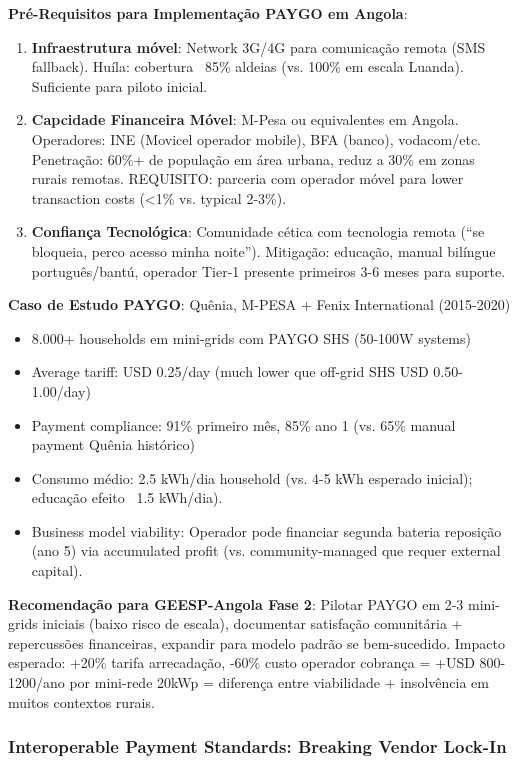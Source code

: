 \documentclass[12pt, a4paper]{article}
\begin{document}
\textbf{Pré-Requisitos para Implementação PAYGO em Angola}:
\begin{enumerate}
\item \textbf{Infraestrutura móvel}: Network 3G/4G para comunicação remota (SMS fallback). Huíla: cobertura ~85\% aldeias (vs. 100\% em escala Luanda). Suficiente para piloto inicial.
\item \textbf{Capcidade Financeira Móvel}: M-Pesa ou equivalentes em Angola. Operadores: INE (Movicel operador mobile), BFA (banco), vodacom/etc. Penetração: 60\%+ de população em área urbana, reduz a 30\% em zonas rurais remotas. REQUISITO: parceria com operador móvel para lower transaction costs (<1\% vs. typical 2-3\%).
\item \textbf{Confiança Tecnológica}: Comunidade cética com tecnologia remota (``se bloqueia, perco acesso minha noite''). Mitigação: educação, manual bilíngue português/bantú, operador Tier-1 presente primeiros 3-6 meses para suporte.
\end{enumerate}

\textbf{Caso de Estudo PAYGO}: Quênia, M-PESA + Fenix International (2015-2020)
\begin{itemize}
\item 8.000+ households em mini-grids com PAYGO SHS (50-100W systems)
\item Average tariff: USD 0.25/day (much lower que off-grid SHS USD 0.50-1.00/day)
\item Payment compliance: 91\% primeiro mês, 85\% ano 1 (vs. 65\% manual payment Quênia histórico)
\item Consumo médio: 2.5 kWh/dia household (vs. 4-5 kWh esperado inicial); educação efeito ~1.5 kWh/dia).
\item Business model viability: Operador pode financiar segunda bateria reposição (ano 5) via accumulated profit (vs. community-managed que requer external capital).
\end{itemize}

\textbf{Recomendação para GEESP-Angola Fase 2}:
Pilotar PAYGO em 2-3 mini-grids iniciais (baixo risco de escala), documentar satisfação comunitária + repercussões financeiras, expandir para modelo padrão se bem-sucedido. Impacto esperado: +20\% tarifa arrecadação, -60\% custo operador cobrança = +USD 800-1200/ano por mini-rede 20kWp = diferença entre viabilidade + insolvência em muitos contextos rurais.

\subsubsection{Interoperable Payment Standards: Breaking Vendor Lock-In}
\end{document}
